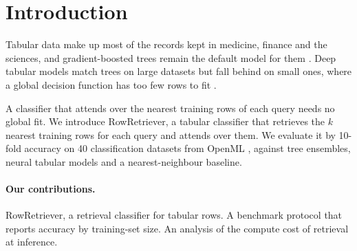 \section{Introduction}
Tabular data make up most of the records kept in medicine, finance and the sciences, and gradient-boosted trees remain the default model for them \citep{chen2016xgboost}.
Deep tabular models match trees on large datasets but fall behind on small ones, where a global decision function has too few rows to fit \citep{grinsztajn2022tree}.

A classifier that attends over the nearest training rows of each query needs no global fit.
We introduce RowRetriever, a tabular classifier that retrieves the $k$ nearest training rows for each query and attends over them.
We evaluate it by 10-fold accuracy on 40 classification datasets from OpenML \citep{vanschoren2014openml}, against tree ensembles, neural tabular models and a nearest-neighbour baseline.

\paragraph{Our contributions.}
RowRetriever, a retrieval classifier for tabular rows. A benchmark protocol that reports accuracy by training-set size. An analysis of the compute cost of retrieval at inference.
